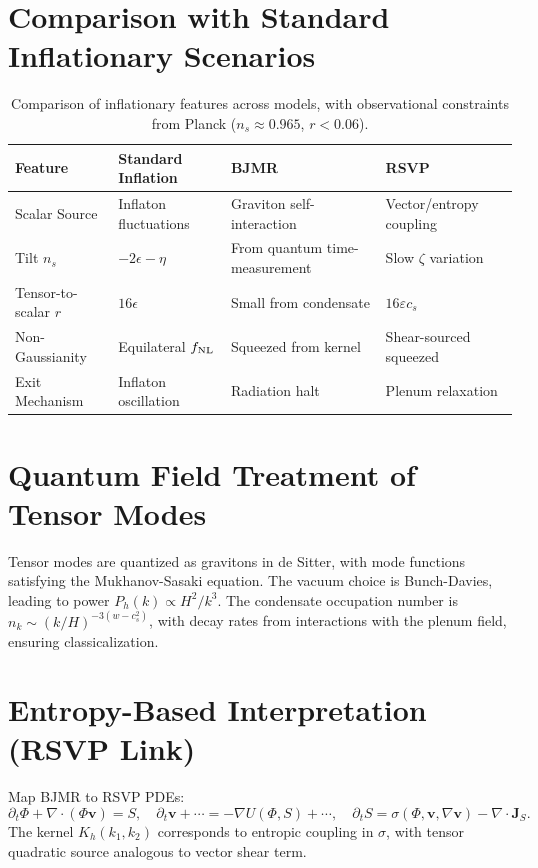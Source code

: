 \documentclass[12pt, a4paper, openany]{book}
\theoremstyle{definition}
\begin{document}
\chapter{Comparison with Standard Inflationary Scenarios}
\begin{table}[H]
\centering
\begin{tabular}{p{3cm}p{4cm}p{4cm}p{4cm}}
\toprule
\textbf{Feature} & \textbf{Standard Inflation} & \textbf{BJMR} & \textbf{RSVP} \\
\midrule
Scalar Source & Inflaton fluctuations & Graviton self-interaction & Vector/entropy coupling \\
Tilt $n_s$ & $-2\epsilon - \eta$ & From quantum time-measurement & Slow $\zeta$ variation \\
Tensor-to-scalar $r$ & $16\epsilon$ & Small from condensate & $16 \varepsilon c_s$ \\
Non-Gaussianity & Equilateral $f_{\rm NL}$ & Squeezed from kernel & Shear-sourced squeezed \\
Exit Mechanism & Inflaton oscillation & Radiation halt & Plenum relaxation \\
\bottomrule
\end{tabular}
\caption{Comparison of inflationary features across models, with observational constraints from Planck ($n_s \approx 0.965$, $r < 0.06$).}
\label{tab:inflation-comparison}
\end{table}

\chapter{Quantum Field Treatment of Tensor Modes}
Tensor modes are quantized as gravitons in de Sitter, with mode functions satisfying the Mukhanov-Sasaki equation. The vacuum choice is Bunch-Davies, leading to power $P_h(k) \propto H^2 / k^3$. The condensate occupation number is $n_k \sim (k/H)^{-3( w - c_s^2 )}$, with decay rates from interactions with the plenum field, ensuring classicalization.

\chapter{Entropy-Based Interpretation (RSVP Link)}
Map BJMR to RSVP PDEs:
\begin{equation}
\partial_t \Phi + \nabla \cdot (\Phi \mathbf{v}) = S, \quad \partial_t \mathbf{v} + \cdots = - \nabla U(\Phi, S) + \cdots, \quad \partial_t S = \sigma(\Phi, \mathbf{v}, \nabla \mathbf{v}) - \nabla \cdot \mathbf{J}_S.
\end{equation}
The kernel $K_h(k_1,k_2)$ corresponds to entropic coupling in $\sigma$, with tensor quadratic source analogous to vector shear term.
\end{document}
